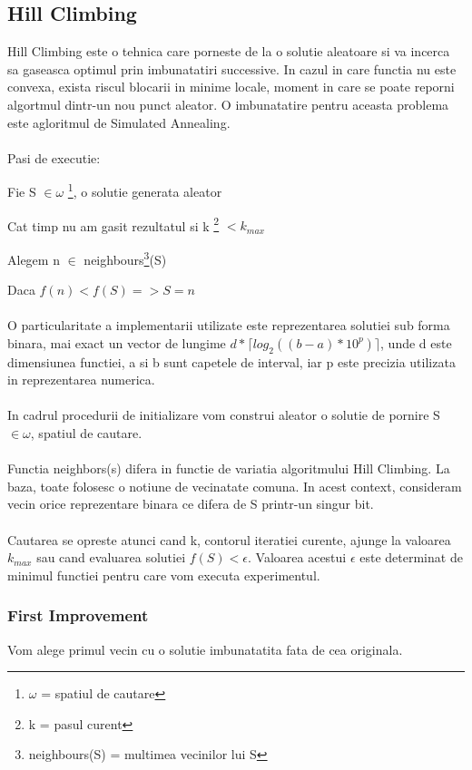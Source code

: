 \documentclass{article}
\begin{document}
\subsection{Hill Climbing}
Hill Climbing este o tehnica care porneste de la o solutie aleatoare si va incerca sa gaseasca optimul prin imbunatatiri successive. In cazul in care functia nu este convexa, exista riscul blocarii in minime locale, moment in care se poate reporni algortmul dintr-un nou punct aleator. O imbunatatire pentru aceasta problema este agloritmul de Simulated Annealing.\\
\\
Pasi de executie:

Fie S $\in \omega$ \footnote{$\omega$ = spatiul de cautare}, o solutie generata aleator

Cat timp nu am gasit rezultatul si k \footnote{k = pasul curent} $ < k_{max}$ 

\hspace*{10mm} Alegem n $\in$ neighbours\footnote{neighbours(S) = multimea vecinilor lui S}(S)

\hspace*{10mm} Daca $f(n) < f(S) => S = n$\\\\

O particularitate a implementarii utilizate este reprezentarea solutiei sub forma binara, mai exact un vector de lungime $d*\lceil log_2((b-a) * 10^p) \rceil$, unde d este dimensiunea functiei, a si b sunt capetele de interval, iar p este precizia utilizata in reprezentarea numerica.\\\\
In cadrul procedurii de initializare vom construi aleator o solutie de pornire S $\in \omega$, spatiul de cautare.\\\\
Functia neighbors(s) difera in functie de variatia algoritmului Hill Climbing. La baza, toate folosesc o notiune de vecinatate comuna. In acest context, consideram vecin orice reprezentare binara ce difera de S printr-un singur bit.\\\\
Cautarea se opreste atunci cand k, contorul iteratiei curente, ajunge la valoarea $k_{max}$ sau cand evaluarea solutiei $f(S) < \epsilon$. Valoarea acestui $\epsilon$ este determinat de minimul functiei pentru care vom executa experimentul.

\subsubsection{First Improvement}
Vom alege primul vecin cu o solutie imbunatatita fata de cea originala.
\end{document}
